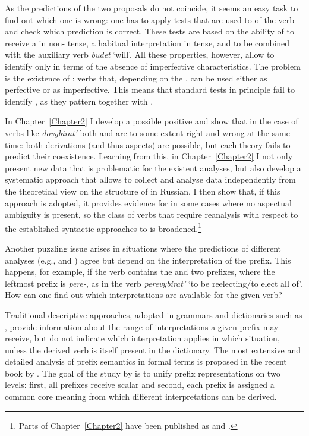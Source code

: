 As the predictions of the two proposals do not coincide, it seems an easy task to find out which one is wrong: one has to apply tests that are used to  of the verb and check which prediction is correct. These tests are based on the ability of  to receive a  in non- tense, a habitual interpretation in  tense, and to be combined with the auxiliary verb \textit{budet} `will'. All these properties, however, allow to identify  only in terms of the absence of imperfective characteristics. The problem is the existence of : verbs that, depending on the , can be used either as perfective or as imperfective. This means that standard tests in principle fail to identify , as they pattern together with .

In Chapter~\ref{Chapter2} I develop a possible positive  and show that in the case of verbs like \textit{dovybirat'} both \citet{Svenonius:04b} and \citet{Tatevosov:07} are to some extent right and wrong at the same time: both derivations (and thus aspects) are possible, but each theory fails to predict their coexistence. Learning from this, in Chapter~\ref{Chapter2} I not only present new data that is problematic for the existent analyses, but also develop a systematic approach that allows to collect and analyse data independently from the theoretical view on the structure of  in Russian. I then show that, if this approach is adopted, it provides evidence for  in some cases where no aspectual ambiguity is present, so the class of verbs that require reanalysis with respect to the established syntactic approaches to  is broadened.\footnote{Parts of Chapter~\ref{Chapter2} have been published as \citealt{ZinovaFilip:13} and \citealt{ZinovaOsswald:paper}.}

Another puzzling issue arises in situations where the predictions of different analyses (e.g., \citealt{Svenonius:04b} and \citealt{Tatevosov:07}) agree but depend on the interpretation of the prefix. This happens, for example, if the verb contains the  and two prefixes, where the leftmost prefix is \textit{pere-}, as in the verb \textit{perevybirat'} `to be reelecting/to elect all of'. How can one find out which interpretations are available for the given verb? 

\hspace*{-0.64717pt}Traditional descriptive approaches, adopted in grammars and dictionaries such as \citet{Shvedova:82}, provide information about the range of interpretations a given prefix may receive, but do not indicate which interpretation applies in which situation, unless the derived verb is itself present in the dictionary. The most extensive and detailed analysis of prefix semantics in formal terms is proposed in the recent book by \citet{Kagan:book}. The goal of the study by \citet{Kagan:book} is to unify prefix representations on two levels: first, all prefixes receive scalar  and second, each prefix is assigned a common core meaning from which different interpretations can be derived. 


